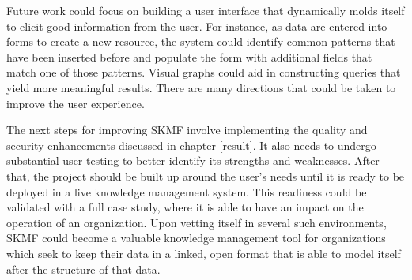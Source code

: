 Future work could focus on building a user interface that dynamically molds itself to elicit good information from the user. For instance, as data are entered into forms to create a new resource, the system could identify common patterns that have been inserted before and populate the form with additional fields that match one of those patterns. Visual graphs could aid in constructing queries that yield more meaningful results. There are many directions that could be taken to improve the user experience.

The next steps for improving SKMF involve implementing the quality and security enhancements discussed in chapter
\ref{result}.
It also needs to undergo substantial user testing to better identify its strengths and weaknesses. After that, the project should be built up around the user's needs until it is ready to be deployed in a live knowledge management system. This readiness could be validated with a full case study, where it is able to have an impact on the operation of an organization. Upon vetting itself in several such environments, SKMF could become a valuable knowledge management tool for organizations which seek to keep their data in a linked, open format that is able to model itself after the structure of that data.
